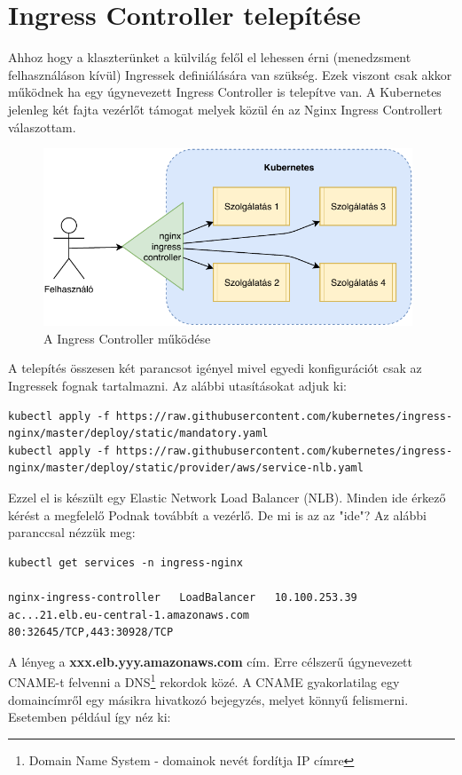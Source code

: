 \section{Ingress Controller telepítése}
Ahhoz hogy a klaszterünket a külvilág felől el lehessen érni (menedzsment felhasználáson kívül) Ingressek definiálására van szükség. Ezek viszont csak akkor működnek ha egy úgynevezett Ingress Controller is telepítve van. A Kubernetes jelenleg két fajta vezérlőt támogat\cite{ingresscontroller_k8s} melyek közül én az Nginx Ingress Controllert válaszottam.
\begin{figure}[ht]
\centering
\includegraphics[width=110mm, keepaspectratio]{img/nginx_controller.pdf}
\caption{A Ingress Controller működése}
\end{figure}
\vskip 0.1in
A telepítés összesen két parancsot igényel mivel egyedi konfigurációt csak az Ingressek fognak tartalmazni. Az alábbi utasításokat adjuk ki:
\begin{lstlisting}
kubectl apply -f https://raw.githubusercontent.com/kubernetes/ingress-nginx/master/deploy/static/mandatory.yaml
kubectl apply -f https://raw.githubusercontent.com/kubernetes/ingress-nginx/master/deploy/static/provider/aws/service-nlb.yaml
\end{lstlisting}
Ezzel el is készült egy Elastic Network Load Balancer (NLB). Minden ide érkező kérést a megfelelő Podnak továbbít a vezérlő. De mi is az az "ide"? Az alábbi paranccsal nézzük meg:
\begin{lstlisting}
kubectl get services -n ingress-nginx

nginx-ingress-controller   LoadBalancer   10.100.253.39   ac...21.elb.eu-central-1.amazonaws.com 
80:32645/TCP,443:30928/TCP
\end{lstlisting}
A lényeg a \textbf{xxx.elb.yyy.amazonaws.com} cím. Erre célszerű úgynevezett CNAME-t felvenni a DNS\footnote{Domain Name System - domainok nevét fordítja IP címre} rekordok közé. A CNAME gyakorlatilag egy domaincímről egy másikra hivatkozó bejegyzés, melyet könnyű felismerni. Esetemben például így néz ki:
